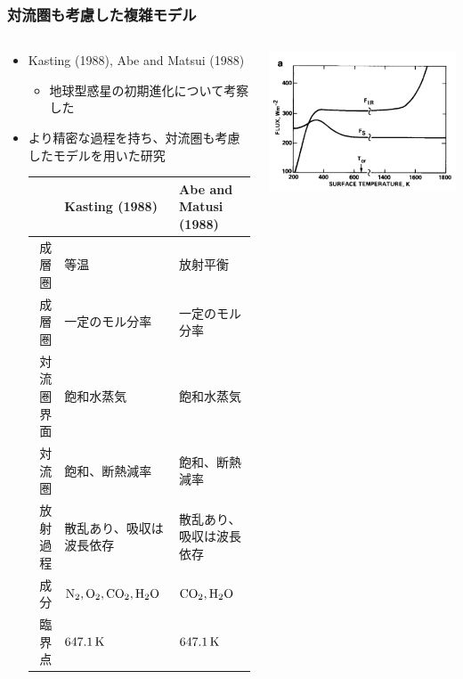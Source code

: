 \documentclass[aspectratio=149,9pt]{beamer}
\begin{document}
\begin{frame}
	\frametitle{対流圏も考慮した複雑モデル}
	\small
	\begin{columns}[T,onlytextwidth]
		\begin{column}{.7\textwidth}
			\begin{itemize}
				\item Kasting (1988), Abe and Matsui (1988)
					\begin{itemize}
						\item 地球型惑星の初期進化について考察した
					\end{itemize}
				\item より精密な過程を持ち、対流圏も考慮したモデルを用いた研究
					\begin{table}
						\tiny
						\centering
						\begin{tabular}{rll}
							\hline
							 &Kasting (1988)&Abe and Matusi (1988)\\
							\hline
							成層圏&等温&放射平衡\\
							成層圏&一定のモル分率&一定のモル分率\\
							対流圏界面&飽和水蒸気&飽和水蒸気\\
							対流圏&飽和、断熱減率&飽和、断熱減率\\
							放射過程&散乱あり、吸収は波長依存&散乱あり、吸収は波長依存\\
							成分&\(\ce{N2, O2, CO2, H2O}\)&\(\ce{CO2, H2O}\)\\
							臨界点&\(647.1\hmu{K}\)&\(647.1\hmu{K}\)\\
							\hline
						\end{tabular}
					\end{table}
			\end{itemize}
		\end{column}
		\begin{column}{.3\textwidth}
			\centering
			\includegraphics[width=\textwidth]{kasting7a.png}\\

\end{column}
\end{columns}
\end{frame}
\end{document}
